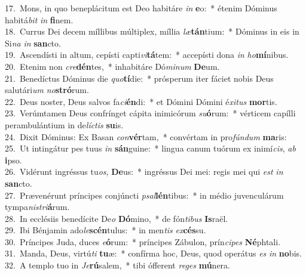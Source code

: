 {17.~}Mons, in quo beneplácitum est Deo habitáre \textit{in} \textbf{e}o:~* étenim Dóminus habitá\textit{bit} \textit{in} \textbf{fi}nem.\\
{18.~}Currus Dei decem míllibus múltiplex, míllia \textit{læ}\textbf{tán}tium:~* Dóminus in eis in Si\textit{na} \textit{in} \textbf{san}cto.\\
{19.~}Ascendísti in altum, cepísti capti\textit{vi}\textbf{tá}tem:~* accepísti dona \textit{in} \textit{ho}\textbf{mí}nibus.\\
{20.~}Etenim non \textit{cre}\textbf{dén}tes,~* inhabitáre Dó\textit{mi}\textit{num} \textbf{De}um.\\
{21.~}Benedíctus Dóminus die \textit{quo}\textbf{tí}die:~* prósperum iter fáciet nobis Deus salutári\textit{um} \textit{no}\textbf{stró}rum.\\
{22.~}Deus noster, Deus salvos fa\textit{ci}\textbf{én}di:~* et Dómini Dómini é\textit{xi}\textit{tus} \textbf{mor}tis.\\
{23.~}Verúmtamen Deus confrínget cápita inimicórum \textit{su}\textbf{ó}rum:~* vérticem capílli perambulántium in de\textit{lí}\textit{ctis} \textbf{su}is.\\
{24.~}Dixit Dóminus: Ex Basan \textit{con}\textbf{vér}tam,~* convértam in pro\textit{fún}\textit{dum} \textbf{ma}ris:\\
{25.~}Ut intingátur pes tuus \textit{in} \textbf{sán}guine:~* lingua canum tuórum ex inimí\textit{cis}, \textit{ab} \textbf{i}pso.\\
{26.~}Vidérunt ingréssus tu\textit{os}, \textbf{De}us:~* ingréssus Dei mei: regis mei qui \textit{est} \textit{in} \textbf{san}cto.\\
{27.~}Prævenérunt príncipes conjúncti \textit{psal}\textbf{lén}tibus:~* in médio juvenculárum tympa\textit{ni}\textit{stri}\textbf{á}rum.\\
{28.~}In ecclésiis benedícite De\textit{o} \textbf{Dó}mino,~* de fón\textit{ti}\textit{bus} \textbf{Is}raël.\\
{29.~}Ibi Bénjamin ado\textit{le}\textbf{scén}tulus:~* in men\textit{tis} \textit{ex}\textbf{cés}su.\\
{30.~}Príncipes Juda, duces \textit{e}\textbf{ó}rum:~* príncipes Zábulon, prín\textit{ci}\textit{pes} \textbf{Né}phtali.\\
{31.~}Manda, Deus, virtú\textit{ti} \textbf{tu}æ:~* confírma hoc, Deus, quod operátus \textit{es} \textit{in} \textbf{no}bis.\\
{32.~}A templo tuo in \textit{Je}\textbf{rú}salem,~* tibi ófferent \textit{re}\textit{ges} \textbf{mú}nera.\\
